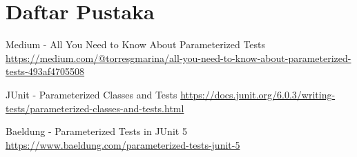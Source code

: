 \documentclass[a4paper,12pt]{article}
\begin{document}
\section{Daftar Pustaka}
\begin{enumerate}[label={[\arabic*]}]
    \item Medium - All You Need to Know About Parameterized Tests \url{https://medium.com/@torresgmarina/all-you-need-to-know-about-parameterized-tests-493af4705508}
    \item JUnit - Parameterized Classes and Tests \url{https://docs.junit.org/6.0.3/writing-tests/parameterized-classes-and-tests.html}
    \item Baeldung - Parameterized Tests in JUnit 5 \url{https://www.baeldung.com/parameterized-tests-junit-5 }
\end{enumerate}
\end{document}
